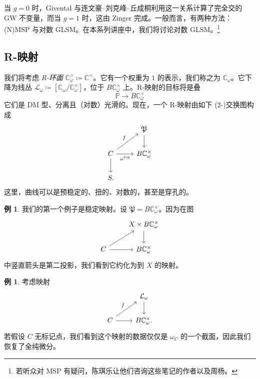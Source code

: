 \documentclass{amsart}
\theoremstyle{definition}
\newtheorem{exm}[thm]{例}
\theoremstyle{remark}
\theoremstyle{plain}
\theoremstyle{definition}
\theoremstyle{remark}
\newcommand{\C}{\mathbb{C}}
\renewcommand{\P}{\mathbb{P}}
\newcommand{\mc}[1]{\mathcal{#1}}
\newcommand{\mf}[1]{\mathfrak{#1}}
\newcommand{\1}{\mathbf{1}}
\newcommand{\2}{\mathbf{2}}
\newcommand{\3}{\mathbf{3}}
\begin{document}
当 \(g = 0\) 时，Givental 与连文豪–刘克峰–丘成桐利用这一关系计算了完全交的 GW 不变量，而当 \(g = 1\) 时，这由 Zinger 完成。一般而言，有两种方法：(N)MSP 与对数 GLSM。在本系列讲座中，我们将讨论对数 GLSM。\footnote{若听众对 MSP 有疑问，陈琪乐让他们咨询这些笔记的作者以及周杨。}

\subsection{R-映射}%
\label{sub:R-maps}

我们将考虑 \textit{R-环面} \(\C^{\times}_{\omega} \coloneqq \C^{\times}\)。它有一个权重为 \(1\) 的表示，我们称之为 \(\C_{\omega}\)。它下降为线丛 \(\mc{L}_{\omega} \coloneqq [\C_{\omega} / \C^{\times}_{\omega}]\)，位于 \(B \C_{\omega}^{\times}\) 上。R-映射的目标将是叠
\[ \P \to B \C^{\times}_{\omega} \]
它们是 DM 型、分离且（对数）光滑的。现在，一个 R-映射由如下 (2-)交换图构成
\begin{equation*}
\begin{tikzcd}
    & \mf{P} \ar{d} \\
    C \ar{ur}{f} \ar{r}[swap]{\omega^{\log}} \ar{d} & B \C_{\omega}^{\times} \\
    S.
\end{tikzcd}
\end{equation*}
这里，曲线可以是预稳定的、扭的、对数的，甚至是穿孔的。

\begin{exm}
    我们的第一个例子是稳定映射。设 \(\mf{P} = B\C_{\omega}^{\times}\)。因为在图
    \begin{equation*}
    \begin{tikzcd}
        & X \times B\C_{\omega}^{\times} \ar{d} \\
        C \ar{ur} \ar{r} & B \C_{\omega}^{\times}
    \end{tikzcd}
    \end{equation*}
    中竖直箭头是第二投影，我们看到它约化为到 \(X\) 的映射。
\end{exm}

\begin{exm}
    考虑映射
    \begin{equation*}
    \begin{tikzcd}
        & \mc{L}_{\omega} \ar{d} \\
        C \ar{ur}{f} \ar{r} & B \C_{\omega}^{\times}.
    \end{tikzcd}
    \end{equation*}
    若假设 \(C\) 无标记点，我们看到这个映射的数据仅仅是 \(\omega_C\) 的一个截面，因此我们恢复了全纯微分。
\end{exm}
\end{document}
